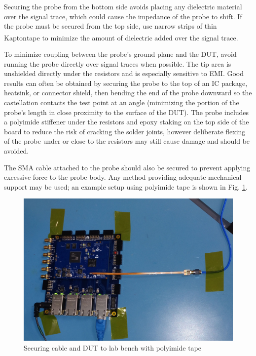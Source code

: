 \documentclass[11pt]{article}
\newcommand{\rtm}{\textsuperscript{\textregistered\space}}
\begin{document}
Securing the probe from the bottom side avoids placing any dielectric material over the signal trace, which could cause
the impedance of the probe to shift. If the probe must be secured from the top side, use narrow strips of thin
Kapton\rtm tape to minimize the amount of dielectric added over the signal trace.

To minimize coupling between the probe's ground plane and the DUT, avoid running the probe directly over signal traces
when possible. The tip area is unshielded directly under the resistors and is especially sensitive to EMI. Good results
can often be obtained by securing the probe to the top of an IC package, heatsink, or connector shield, then bending
the end of the probe downward so the castellation contacts the test point at an angle (minimizing the portion of the
probe's length in close proximity to the surface of the DUT). The probe includes a polyimide stiffener under the
resistors and epoxy staking on the top side of the board to reduce the risk of cracking the solder joints, however
deliberate flexing of the probe under or close to the resistors may still cause damage and should be avoided.

The SMA cable attached to the probe should also be secured to prevent applying excessive force to the probe body. Any
method providing adequate mechanical support may be used; an example setup using polyimide tape is shown in Fig.
\ref{cable-secured}.

\begin{figure}[h]
\centering
\includegraphics[width=12cm]{cable-secured.jpg}
\caption{Securing cable and DUT to lab bench with polyimide tape}
\label{cable-secured}
\end{figure}

\FloatBarrier
\end{document}
